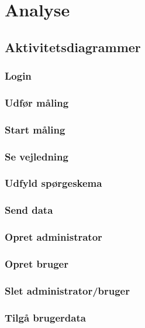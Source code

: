 \section{Analyse}

\subsection{Aktivitetsdiagrammer}

\subsubsection{Login}

\subsubsection{Udfør måling}

\subsubsection{Start måling}

\subsubsection{Se vejledning}

\subsubsection{Udfyld spørgeskema}

\subsubsection{Send data}

\subsubsection{Opret administrator}

\subsubsection{Opret bruger}

\subsubsection{Slet administrator/bruger}

\subsubsection{Tilgå brugerdata}

